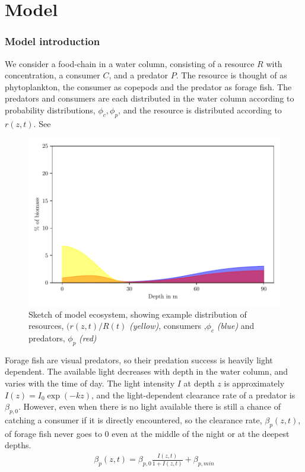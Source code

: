 
\section{Model}

\subsubsection*{Model introduction}
We consider a food-chain in a water column, consisting of a resource $R$ with concentration, a consumer $C$, and a predator $P$. The resource is thought of as phytoplankton, the consumer as copepods and the predator as forage fish. The predators and consumers are each distributed in the water column according to probability distributions, $\phi_c,\phi_p$, and the resource is distributed according to $r(z,t)$. See 
\begin{figure}
 \begin{centering}
   \includegraphics{plots/sketch_for_article.pdf}
 \end{centering}
 \label{fig:model_sketch}
 \caption{Sketch of model ecosystem, showing example distribution of resources, $(r(z,t)/R(t)$ \emph{(yellow)}, consumers ,$\phi_c$ \emph{(blue)} and predators, $\phi_p$ \emph{(red)}}
\end{figure}

Forage fish are visual predators, so their predation success is heavily light dependent. The available light decreases with depth in the water column, and varies with the time of day.
The light intensity $I$ at depth $z$ is approximately $I(z) = I_0\exp(-kz)$, and the light-dependent clearance rate of a predator is $\beta_{p,0}$.  However, even when there is no light available there is still a chance of catching a consumer if it is directly encountered,  so the clearance rate, $\beta_p(z,t)$, of forage fish never goes to 0 even at the middle of the night or at the deepest depths.
\begin{align*}
  \beta_p(z,t) = \beta_{p,0} \frac{I(z,t)}{1+I(z,t)} + \beta_{p,min}
\end{align*}


